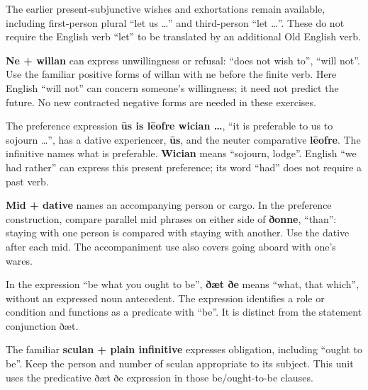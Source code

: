 The earlier present-subjunctive wishes and exhortations remain available, including first-person plural “let us …” and third-person “let …”. These do not require the English verb “let” to be translated by an additional Old English verb.

\textbf{Ne + willan} can express unwillingness or refusal: “does not wish to”, “will not”. Use the familiar positive forms of willan with ne before the finite verb. Here English “will not” can concern someone’s willingness; it need not predict the future. No new contracted negative forms are needed in these exercises.

The preference expression \textbf{ūs is lēofre wician …}, “it is preferable to us to sojourn …”, has a dative experiencer, \textbf{ūs}, and the neuter comparative \textbf{lēofre}. The infinitive names what is preferable. \textbf{Wician} means “sojourn, lodge”. English “we had rather” can express this present preference; its word “had” does not require a past verb.

\textbf{Mid + dative} names an accompanying person or cargo. In the preference construction, compare parallel mid phrases on either side of \textbf{ðonne}, “than”: staying with one person is compared with staying with another. Use the dative after each mid. The accompaniment use also covers going aboard with one’s wares.

In the expression “be what you ought to be”, \textbf{ðæt ðe} means “what, that which”, without an expressed noun antecedent. The expression identifies a role or condition and functions as a predicate with “be”. It is distinct from the statement conjunction ðæt.

The familiar \textbf{sculan + plain infinitive} expresses obligation, including “ought to be”. Keep the person and number of sculan appropriate to its subject. This unit uses the predicative ðæt ðe expression in those be/\allowbreak{}ought-to-be clauses.

